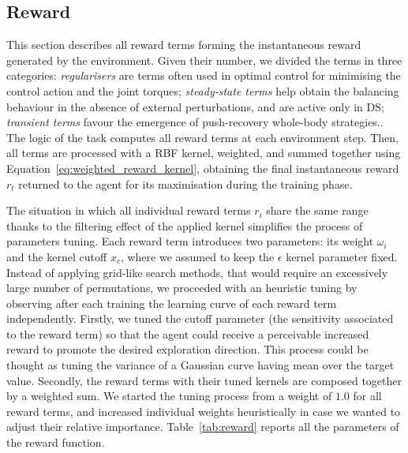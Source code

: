 \subsection{Reward}

This section describes all reward terms forming the instantaneous reward generated by the environment.
Given their number, we divided the terms in three categories: \emph{regularisers} are terms often used in optimal control for minimising the control action and the joint torques; \emph{steady-state terms} help obtain the balancing behaviour in the absence of external perturbations, and are active only in \ac{DS}; \emph{transient terms} favour the emergence of push-recovery whole-body strategies..
The logic of the task computes all reward terms at each environment step.
Then, all terms are processed with a \ac{RBF} kernel, weighted, and summed together using Equation~\eqref{eq:weighted_reward_kernel}, obtaining the final instantaneous reward $r_t$ returned to the agent for its maximisation during the training phase.

The situation in which all individual reward terms $r_i$ share the same range thanks to the filtering effect of the applied kernel simplifies the process of parameters tuning.
Each reward term introduces two parameters: its weight $\omega_i$ and the kernel cutoff $x_c$, where we assumed to keep the $\epsilon$ kernel parameter fixed.
Instead of applying grid-like search methods, that would require an excessively large number of permutations, we proceeded with an heuristic tuning by observing after each training the learning curve of each reward term independently.
Firstly, we tuned the cutoff parameter (\ie the sensitivity associated to the reward term) so that the agent could receive a perceivable increased reward to promote the desired exploration direction.
This process could be thought as tuning the variance of a Gaussian curve having mean over the target value.
Secondly, the reward terms with their tuned kernels are composed together by a weighted sum.
We started the tuning process from a weight of $1.0$ for all reward terms, and increased individual weights heuristically in case we wanted to adjust their relative importance.
Table~\ref{tab:reward} reports all the parameters of the reward function. 

